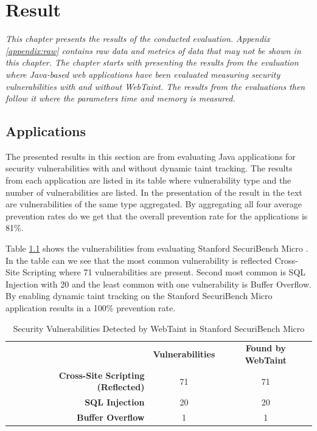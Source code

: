\chapter{Result}
\label{Result}
\textit{This chapter presents the results of the conducted evaluation. Appendix \ref{appendix:raw} contains raw data and metrics of data that may not be shown in this chapter. The chapter starts with presenting the results from the \textit{} evaluation where Java-based web applications have been evaluated measuring security vulnerabilities with and without WebTaint. The results from the \textit{} evaluations then follow it where the parameters time and memory is measured.}



\section{Applications}
\label{Applications}
The presented results in this section are from evaluating Java applications for security vulnerabilities with and without dynamic taint tracking. The results from each application are listed in its table where vulnerability type and the number of vulnerabilities are listed. In the presentation of the result in the text are vulnerabilities of the same type aggregated. By aggregating all four average prevention rates do we get that the overall prevention rate for the applications is 81\%.

Table \ref{table:MicroTable} shows the vulnerabilities from evaluating Stanford SecuriBench Micro \parencite{securiBenchMicro}. In the table can we see that the most common vulnerability is reflected Cross-Site Scripting where 71 vulnerabilities are present. Second most common is SQL Injection with 20 and the least common with one vulnerability is Buffer Overflow. By enabling dynamic taint tracking on the Stanford SecuriBench Micro \parencite{securiBenchMicro} application results in a 100\% prevention rate.

\begin{table}[H]
  \centering
  \caption{Security Vulnerabilities Detected by WebTaint in Stanford SecuriBench Micro}
  \label{table:MicroTable}
    \begin{tabular}{rcc}
      & \textbf{Vulnerabilities} & \textbf{Found by WebTaint} \\
      \textbf{Cross-Site Scripting (Reflected)} & 71            & 71  \\
      \textbf{SQL Injection}                    & 20            & 20  \\
      \textbf{Buffer Overflow}                  & 1             & 1  
    \end{tabular}
\end{table}

